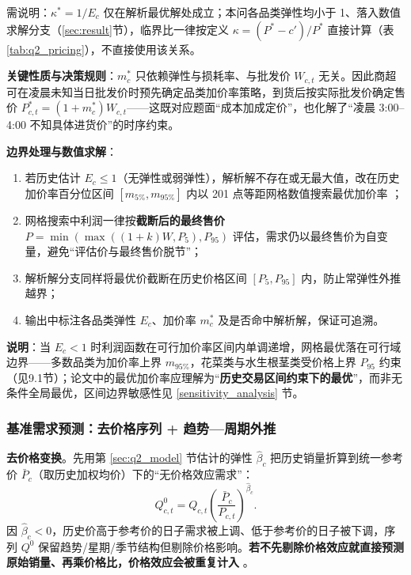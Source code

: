 需说明：$\kappa^*=1/E_c$ 仅在解析最优解处成立；本问各品类弹性均小于 1、落入数值求解分支（\ref{sec:result}节），临界比一律按定义 $\kappa=(P^*-c')/P^*$ 直接计算（表 \ref{tab:q2_pricing}），不直接使用该关系。

\textbf{关键性质与决策规则}：$m^*_c$ 只依赖弹性与损耗率、与批发价 $W_{c,t}$ 无关。因此商超可在凌晨未知当日批发价时预先确定品类加价率策略，到货后按实际批发价确定售价 $P^*_{c,t}=(1+m^*_c)W_{c,t}$——这既对应题面“成本加成定价”，也化解了“凌晨 3:00–4:00 不知具体进货价”的时序约束。

\textbf{边界处理与数值求解}：

\begin{enumerate}
\item 若历史估计 $E_c\le 1$（无弹性或弱弹性），解析解不存在或无最大值，改在历史加价率百分位区间 $[m_{5\%},m_{95\%}]$ 内以 201 点等距网格数值搜索最优加价率 \cite{tellis1988}；
\item 网格搜索中利润一律按\textbf{截断后的最终售价} $P=\min(\max((1+k)W,P_5),P_{95})$ 评估，需求仍以最终售价为自变量，避免“评估价与最终售价脱节”；
\item 解析解分支同样将最优价截断在历史价格区间 $[P_5,P_{95}]$ 内，防止常弹性外推越界；
\item 输出中标注各品类弹性 $E_c$、加价率 $m^*_c$ 及是否命中解析解，保证可追溯。
\end{enumerate}

\textbf{说明}：当 $E_c<1$ 时利润函数在可行加价率区间内单调递增，网格最优落在可行域边界——多数品类为加价率上界 $m_{95\%}$，花菜类与水生根茎类受价格上界 $P_{95}$ 约束（见9.1节）；论文中的最优加价率应理解为“\textbf{历史交易区间约束下的最优}”，而非无条件全局最优，区间边界敏感性见 \ref{sensitivity_analysis} 节。

\subsubsection{基准需求预测：去价格序列 + 趋势—周期外推}

\textbf{去价格变换}。先用第 \ref{sec:q2_model} 节估计的弹性 $\hat\beta_c$ 把历史销量折算到统一参考价 $\bar P_c$（取历史加权均价）下的“无价格效应需求”：
\begin{equation}
Q^0_{c,t}=Q_{c,t}\left(\frac{\bar P_c}{P_{c,t}}\right)^{\hat\beta_c}.
\end{equation}
因 $\hat\beta_c<0$，历史价高于参考价的日子需求被上调、低于参考价的日子被下调，序列 $Q^0$ 保留趋势/星期/季节结构但剔除价格影响。\textbf{若不先剔除价格效应就直接预测原始销量、再乘价格比，价格效应会被重复计入} \cite{taylor2018,hyndman2018}。

